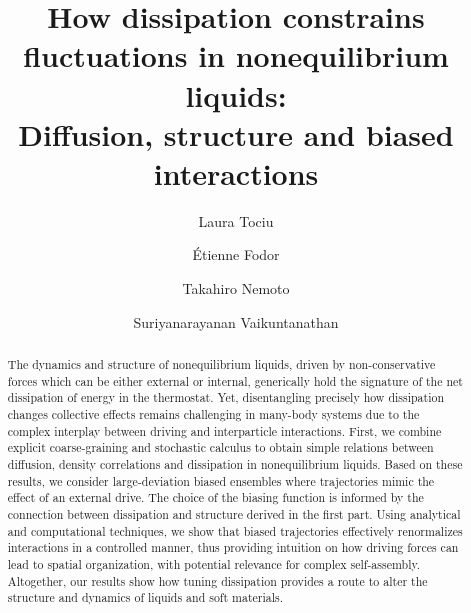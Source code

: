 \documentclass[superscriptaddress, twocolumn, prx, longbibliography, nofootinbib]{revtex4-1}
\begin{document}
\title{How dissipation constrains fluctuations in nonequilibrium liquids:\\Diffusion, structure and biased interactions}
\author{Laura Tociu}

\author{\'Etienne Fodor}

\author{Takahiro Nemoto}

\author{Suriyanarayanan Vaikuntanathan}

\begin{abstract}

The dynamics and structure of nonequilibrium liquids, driven by non-conservative forces which can be either external or internal, generically hold the signature of the net dissipation of energy in the thermostat. Yet, disentangling precisely how dissipation changes collective effects remains challenging in many-body systems due to the complex interplay between driving and interparticle interactions. First, we combine explicit coarse-graining and stochastic calculus to obtain simple relations between diffusion, density correlations and dissipation in nonequilibrium liquids. Based on these results, we consider large-deviation biased ensembles where trajectories mimic the effect of an external drive. The choice of the biasing function is informed by the connection between dissipation and structure derived in the first part. Using analytical and computational techniques, we show that biased trajectories effectively renormalizes interactions in a controlled manner, thus providing intuition on how driving forces can lead to spatial organization, with potential relevance for complex self-assembly. Altogether, our results show how tuning dissipation provides a route to alter the structure and dynamics of liquids and soft materials.

\end{abstract}

\maketitle
\end{document}
